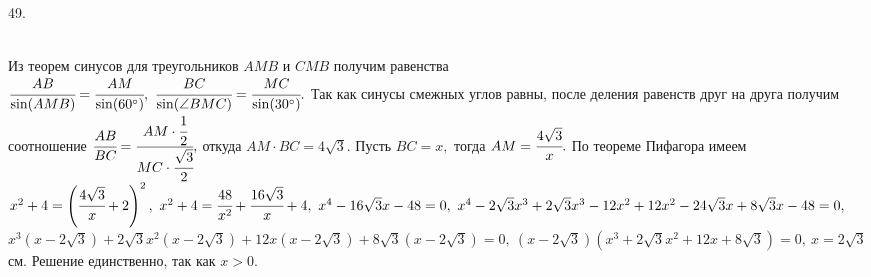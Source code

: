 49. \begin{figure}[ht!]
\end{figure}\\
Из теорем синусов для треугольников $AMB$ и $CMB$ получим равенства\\ $\cfrac{AB}{\sin(AMB)}=\cfrac{AM}{\sin(60^\circ)},\ \cfrac{BC}{\sin(\angle BMC)}= \cfrac{MC}{\sin(30^\circ)}.$ Так как синусы смежных углов равны, после деления равенств друг на друга получим соотношение $\cfrac{AB}{BC}=\cfrac{AM\cdot\cfrac{1}{2}}{MC\cdot\cfrac{\sqrt{3}}{2}},$ откуда $AM\cdot BC=4\sqrt{3}.$ Пусть $BC=x,$ тогда $AM=\cfrac{4\sqrt{3}}{x}.$ По теореме Пифагора имеем $x^2+4=\left(\cfrac{4\sqrt{3}}{x}+2\right)^2,\ x^2+4=\cfrac{48}{x^2}+\cfrac{16\sqrt{3}}{x}+4,\ x^4-16\sqrt{3}x-48=0,\ x^4-2\sqrt{3}x^3+2\sqrt{3}x^3-12x^2+12x^2-24\sqrt{3}x+8\sqrt{3}x-48=0,$\\
$x^3(x-2\sqrt{3})+2\sqrt{3}x^2(x-2\sqrt{3})+12x(x-2\sqrt{3})+8\sqrt{3}(x-2\sqrt{3})=0,\ (x-2\sqrt{3})(x^3+2\sqrt{3}x^2+12x+8\sqrt{3})=0,\ x=2\sqrt{3}$см. Решение единственно, так как $x>0.$\\
